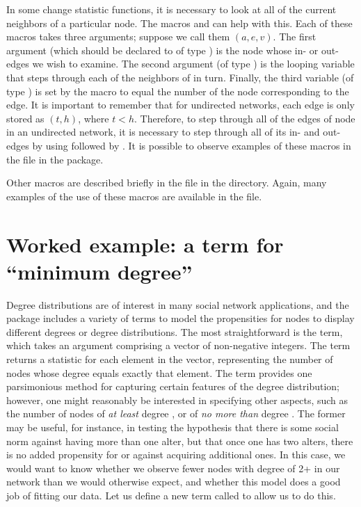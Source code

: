 \documentclass[nojss]{jss}
\begin{document}
In some change statistic functions, it is necessary to look at all of the current
neighbors of a particular node.  The macros
 and 
can help with this.  Each of these macros takes three arguments; suppose
we call them $(a, e, v)$.  The first argument (which should be declared to of type ) is the node whose in- or out-edges
we wish to examine.  The second argument (of type ) is the looping
variable that steps through each of the neighbors of  in turn.  Finally,
the third variable (of type ) is set by the macro to equal the number of
the node corresponding to the edge.  It is important to remember that for undirected
networks, each edge is only stored as $(t,h)$, where $t<h$.
Therefore, to step
through all of the edges of node  in an undirected network, it is necessary
to step through all of its in- and out-edges by using
followed by
.  It is possible to observe
examples of these macros in the  file in the
 package.

Other macros are described briefly in the file  in the 
directory.  Again, many examples of the use of these macros are available in the
 file.


\section{Worked example: a term for ``minimum degree''}
\label{Example}

Degree distributions are of interest in many social network applications, and the  package
includes a variety of terms to model the propensities for nodes to display different degrees or degree distributions.  The most straightforward is the  term, which takes an argument comprising a vector of non-negative integers. The term returns a statistic for each element in the vector, representing the number of nodes whose degree equals exactly that element.  The  term provides one parsimonious method for capturing certain features of the degree distribution; however, one might reasonably be interested in specifying other aspects, such as the number of nodes of {\em at least} degree , or of {\em no more than} degree . The former may be useful, for instance, in testing the hypothesis that there is some social norm against having more than one alter, but that once one has two alters, there is no added propensity for or against acquiring additional ones. In this case, we would want to know whether we observe fewer nodes with degree of 2+ in our network than we would otherwise expect, and whether this model does a good job of fitting our data.  Let us define a new  term called  to allow us to do this.
\end{document}
